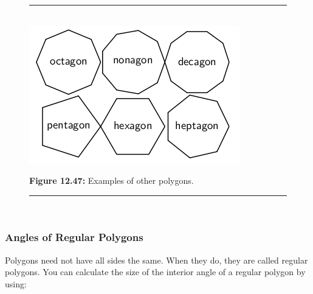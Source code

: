 	\begin{figure}[H] %
    \begin{center}
    \rule[.1in]{\figurerulewidth}{.005in} \\
        \label{m39368*uid93!!!underscore!!!media}\label{m39368*uid93!!!underscore!!!printimage}\includegraphics{col11306.imgs/m39368_MG10C13_046.png} %
      \vspace{2pt}
    \vspace{\rubberspace}\par \begin{cnxcaption}
	  \small \textbf{Figure 12.47: }Examples of other polygons.
	\end{cnxcaption}
    \vspace{.1in}
    \rule[.1in]{\figurerulewidth}{.005in} \\
    \end{center}
 \end{figure}       
      \label{m39368*eip-210}
            \subsubsection{ Angles of Regular Polygons}
            \nopagebreak
            \label{m39368*id319627}Polygons need not have all sides the same. When they do, they are called regular polygons. You can calculate the size of the interior angle of a regular polygon by using:\par 
          \label{m39368*uid96}\nopagebreak\noindent{}
            
